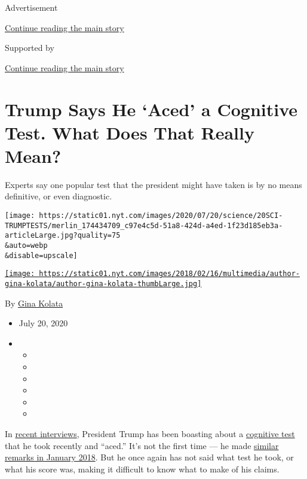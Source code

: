 Advertisement

\protect\hyperlink{after-top}{Continue reading the main story}

Supported by

\protect\hyperlink{after-sponsor}{Continue reading the main story}

\hypertarget{trump-says-he-aced-a-cognitive-test-what-does-that-really-mean}{%
\section{Trump Says He `Aced' a Cognitive Test. What Does That Really
Mean?}\label{trump-says-he-aced-a-cognitive-test-what-does-that-really-mean}}

Experts say one popular test that the president might have taken is by
no means definitive, or even diagnostic.

\texttt{[image: https://static01.nyt.com/images/2020/07/20/science/20SCI-TRUMPTESTS/merlin\_174434709\_c97e4c5d-51a8-424d-a4ed-1f23d185eb3a-articleLarge.jpg?quality=75\\\&auto=webp\\\&disable=upscale]}

\href{https://www.nytimes.com/by/gina-kolata}{\texttt{[image: https://static01.nyt.com/images/2018/02/16/multimedia/author-gina-kolata/author-gina-kolata-thumbLarge.jpg]}}

By \href{https://www.nytimes.com/by/gina-kolata}{Gina Kolata}

\begin{itemize}
\item
  July 20, 2020
\item
  \begin{itemize}
  \item
  \item
  \item
  \item
  \item
  \item
  \end{itemize}
\end{itemize}

In
\href{https://www.nytimes.com/2020/07/10/us/politics/trump-cognitive-test-health.html}{recent
interviews}, President Trump has been boasting about a
\href{https://www.nytimes.com/2020/07/22/us/politics/trump-cognitive-test-results.html}{cognitive
test} that he took recently and ``aced.'' It's not the first time --- he
made
\href{https://www.nytimes.com/2018/01/19/health/trump-cognitive-screening-dementia.html}{similar
remarks in January 2018}. But he once again has not said what test he
took, or what his score was, making it difficult to know what to make of
his claims.

